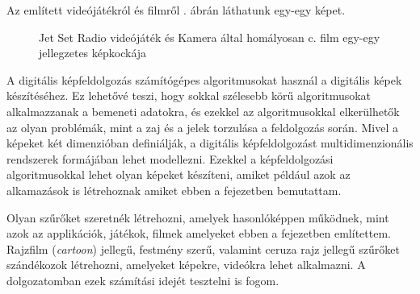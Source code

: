 Az említett videójátékról és filmről . ábrán láthatunk egy-egy képet.

\begin{figure}[ht]
\centering
{}
\caption{Jet Set Radio videójáték és Kamera által homályosan c. film egy-egy jellegzetes képkockája} 
\label{fig:jetset}
\end{figure}


A digitális képfeldolgozás számítógépes algoritmusokat használ a digitális képek készítéséhez. Ez lehetővé teszi, hogy sokkal szélesebb körű algoritmusokat alkalmazzanak a bemeneti adatokra, és ezekkel az algoritmusokkal elkerülhetők az olyan problémák, mint a zaj és a jelek torzulása a feldolgozás során. Mivel a képeket két dimenzióban definiálják, a digitális képfeldolgozást multidimenzionális rendszerek formájában lehet modellezni.  Ezekkel a képfeldolgozási algoritmusokkal lehet olyan képeket készíteni, amiket például azok az alkamazások is létrehoznak amiket ebben a fejezetben bemutattam.



Olyan szűrőket szeretnék létrehozni, amelyek hasonlóképpen működnek, mint azok az applikációk, játékok, filmek amelyeket ebben a fejezetben említettem. Rajzfilm (\textit{cartoon}) jellegű, festmény szerű, valamint ceruza rajz jellegű szűrőket szándékozok létrehozni, amelyeket képekre, videókra lehet alkalmazni. A dolgozatomban ezek számítási idejét tesztelni is fogom.
